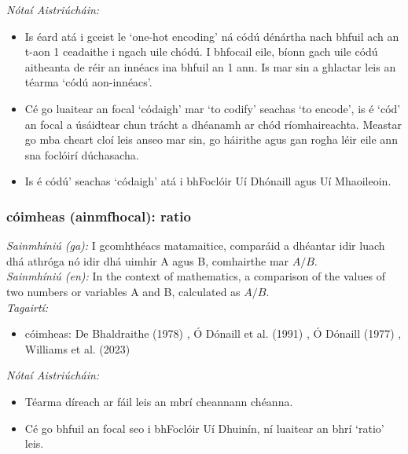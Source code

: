 \documentclass{article}
\begin{document}
 \noindent \textit{Nótaí Aistriúcháin:}
\begin{itemize}
	\item Is éard atá i gceist le `one-hot encoding' ná códú dénártha nach bhfuil ach an t-aon 1 ceadaithe i ngach uile chódú. I bhfocail eile, bíonn gach uile códú aitheanta de réir an innéacs ina bhfuil an 1 ann. Is mar sin a ghlactar leis an téarma `códú aon-innéacs'.
	\item Cé go luaitear an focal `códaigh' mar `to codify' seachas `to encode', is é `cód' an focal a úsáidtear chun trácht a dhéanamh ar chód ríomhaireachta. Meastar go mba cheart cloí leis anseo mar sin, go háirithe agus gan rogha léir eile ann sna foclóirí dúchasacha.
	\item Is é códú' seachas `códaigh' atá i bhFoclóir Uí Dhónaill agus Uí Mhaoileoin.
\end{itemize}


\subsubsection*{cóimheas (ainmfhocal): ratio}
 \noindent \textit{Sainmhíniú (ga):} I gcomhthéacs matamaitice, comparáid a dhéantar idir luach dhá athróga nó idir dhá uimhir A agus B, comhairthe mar $A / B$.
\\
 \noindent \textit{Sainmhíniú (en):} In the context of mathematics, a comparison of the values of two numbers or variables A and B, calculated as $A / B$.
\\
 \noindent \textit{Tagairtí:}
\begin{itemize}
	\item cóimheas: De Bhaldraithe (1978) \cite{de-bhaldraithe}, Ó Dónaill et al. (1991) \cite{focloir-beag}, Ó Dónaill (1977) \cite{odonaill}, Williams et al. (2023) \cite{storchiste}
\end{itemize}

 \noindent \textit{Nótaí Aistriúcháin:}
\begin{itemize}
	\item Téarma díreach ar fáil leis an mbrí cheannann chéanna.
	\item Cé go bhfuil an focal seo i bhFoclóir Uí Dhuinín, ní luaitear an bhrí `ratio' leis.
\end{itemize}
\end{document}

